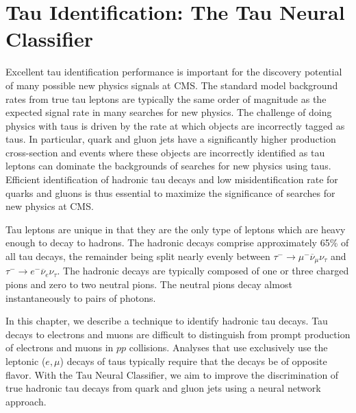 \ifx\master\undefined\fi

\chapter{Tau Identification: The Tau Neural Classifier}
\label{ch:tanc}
%
Excellent tau identification performance is important for the discovery potential of
many possible new physics signals at CMS\@. The
standard model background rates from true tau leptons are typically the same
order of magnitude as the expected signal rate in many searches for new
physics.  The challenge of doing physics with taus is driven by the rate at
which objects are incorrectly tagged as taus.  In particular, quark and gluon
jets have a significantly higher production cross-section and events where
these objects are incorrectly identified as tau leptons can dominate the
backgrounds of searches for new physics using taus.  Efficient identification
of hadronic tau decays and low misidentification rate for quarks and gluons
is thus essential to maximize the significance of searches for new physics at
CMS.

Tau leptons are unique in that they are the only type of leptons which are heavy
enough to decay to hadrons.  The hadronic decays comprise approximately 65\% of
all tau decays, the remainder being split nearly evenly between $\tau^{-} \to
\mu^{-} \overline \nu_\mu \nu_\tau$ and $\tau^{-} \to e^{-} \overline \nu_e \nu_\tau$.
The hadronic decays are typically composed of one or three charged pions and
zero to two neutral pions.  The neutral pions decay almost instantaneously to
pairs of photons.

In this chapter, we describe a technique to identify hadronic tau decays.  Tau
decays to electrons and muons are difficult to distinguish from prompt
production of electrons and muons in $pp$ collisions.  Analyses that use
exclusively use the leptonic ($e,\mu$) decays of taus typically require that the
decays be of opposite flavor.  With the Tau Neural Classifier, we aim to improve
the discrimination of true hadronic tau decays from quark and gluon jets using a
neural network approach.

